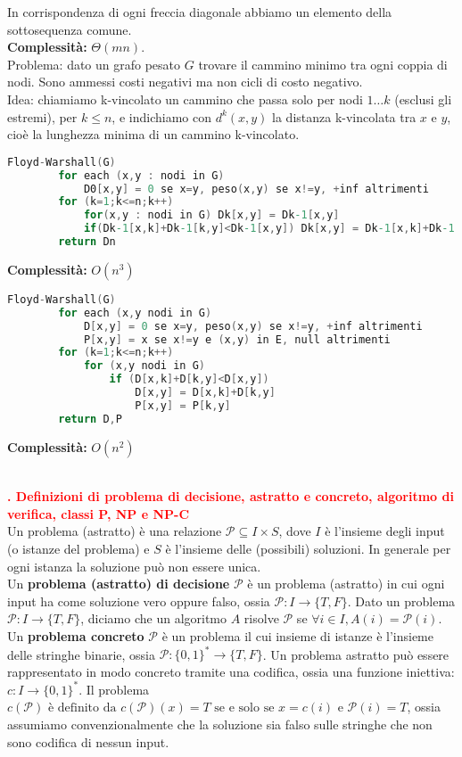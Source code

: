 \documentclass[12pt]{article}
\newcounter{questioncounter}
\newcommand{\question}[1]{
    \stepcounter{questioncounter}
    \textbf{\\\textcolor{red}{\arabic{questioncounter}. #1}}\\
}
\begin{document}
In corrispondenza di ogni freccia diagonale abbiamo un elemento della sottosequenza comune.\\
\textbf{Complessità:} $\Theta(mn)$.\\
Problema: dato un grafo pesato $G$ trovare il cammino minimo tra ogni coppia di nodi. Sono ammessi costi negativi ma non cicli di costo negativo.\\
Idea: chiamiamo k-vincolato un cammino che passa solo per nodi $1\ldots k$ (esclusi gli estremi), per $k\leq n$, e indichiamo con $d^{k}(x,y)$ la distanza k-vincolata tra $x$ e $y$, cioè la lunghezza minima di un cammino k-vincolato.
\begin{lstlisting}[language=C]
    Floyd-Warshall(G)
        for each (x,y : nodi in G)
            D0[x,y] = 0 se x=y, peso(x,y) se x!=y, +inf altrimenti
        for (k=1;k<=n;k++)
            for(x,y : nodi in G) Dk[x,y] = Dk-1[x,y]
            if(Dk-1[x,k]+Dk-1[k,y]<Dk-1[x,y]) Dk[x,y] = Dk-1[x,k]+Dk-1[k,y]
        return Dn
\end{lstlisting}
\textbf{Complessità:} $O(n^{3})$
\begin{lstlisting}[language=C]
    Floyd-Warshall(G)
        for each (x,y nodi in G)
            D[x,y] = 0 se x=y, peso(x,y) se x!=y, +inf altrimenti
            P[x,y] = x se x!=y e (x,y) in E, null altrimenti
        for (k=1;k<=n;k++)
            for (x,y nodi in G)
                if (D[x,k]+D[k,y]<D[x,y])
                    D[x,y] = D[x,k]+D[k,y]
                    P[x,y] = P[k,y]
        return D,P
\end{lstlisting}
\textbf{Complessità:} $O(n^{2})$
\question{Definizioni di problema di decisione, astratto e concreto, algoritmo di verifica, classi P, NP e NP-C}
Un problema (astratto) è una relazione $\mathcal{P}\subseteq I\times S$, dove $I$ è l'insieme degli input (o istanze del problema) e $S$ è l'insieme delle (possibili) soluzioni. In generale per ogni istanza la soluzione può non essere unica.\\
Un \textbf{problema (astratto) di decisione} $\mathcal{P}$ è un problema (astratto) in cui ogni input ha come soluzione vero oppure falso, ossia $\mathcal{P}:I\rightarrow \{T,F\}$. Dato un problema $\mathcal{P}:I\rightarrow \{T,F\}$, diciamo che un algoritmo $A$ risolve $\mathcal{P}$ se $\forall i\in I, A(i)=\mathcal{P}(i)$.\\
Un \textbf{problema concreto} $\mathcal{P}$ è un problema il cui insieme di istanze è l'insieme delle stringhe binarie, ossia $\mathcal{P}:\{0,1\}^{*}\rightarrow \{T,F\}$. Un problema astratto può essere rappresentato in modo concreto tramite una codifica, ossia una funzione iniettiva: $c:I\rightarrow \{0,1\}^{*}$. Il problema $c(\mathcal{P}) \text{ è definito da } c(\mathcal{P})(x)=T \text{ se e solo se } x=c(i) \text{ e } \mathcal{P}(i)=T$, ossia assumiamo convenzionalmente che la soluzione sia falso sulle stringhe che non sono codifica di nessun input.\\
\end{document}
